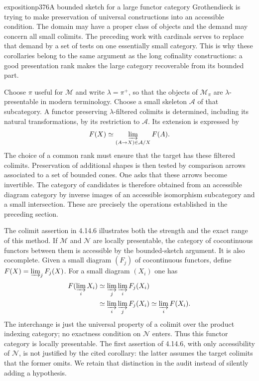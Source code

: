 \begin{dcomment}{exposition}{p376}{A bounded sketch for a large functor category}
Grothendieck is trying to make preservation of universal constructions into an accessible condition. The domain may have a proper class of objects and the demand may concern all small colimits. The preceding work with cardinals serves to replace that demand by a set of tests on one essentially small category. This is why these corollaries belong to the same argument as the long cofinality constructions: a good presentation rank makes the large category recoverable from its bounded part.

Choose $\pi$ useful for $\mathcal M$ and write $\lambda=\pi^+$, so that the objects of $\mathcal M_\pi$ are $\lambda$-presentable in modern terminology. Choose a small skeleton $\mathcal A$ of that subcategory. A functor preserving $\lambda$-filtered colimits is determined, including its natural transformations, by its restriction to $\mathcal A$. Its extension is expressed by
\[
 F(X)\simeq\varinjlim_{(A\to X)\in\mathcal A/X}F(A).
\]
The choice of a common rank must ensure that the target has these filtered colimits. Preservation of additional shapes is then tested by comparison arrows associated to a set of bounded cones. One asks that these arrows become invertible. The category of candidates is therefore obtained from an accessible diagram category by inverse images of an accessible isomorphism subcategory and a small intersection. These are precisely the operations established in the preceding section.

The colimit assertion in 4.14.6 illustrates both the strength and the exact range of this method. If $\mathcal M$ and $\mathcal N$ are locally presentable, the category of cocontinuous functors between them is accessible by the bounded-sketch argument. It is also cocomplete. Given a small diagram $(F_j)$ of cocontinuous functors, define $F(X)=\varinjlim_jF_j(X)$. For a small diagram $(X_i)$ one has
\[
\begin{aligned}
 F(\varinjlim_iX_i)
 &\simeq\varinjlim_j\varinjlim_iF_j(X_i)\\
 &\simeq\varinjlim_i\varinjlim_jF_j(X_i)
 \simeq\varinjlim_iF(X_i).
\end{aligned}
\]
The interchange is just the universal property of a colimit over the product indexing category; no exactness condition on $\mathcal N$ enters. Thus this functor category is locally presentable. The first assertion of 4.14.6, with only accessibility of $\mathcal N$, is not justified by the cited corollary: the latter assumes the target colimits that the former omits. We retain that distinction in the audit instead of silently adding a hypothesis.


\end{dcomment}
